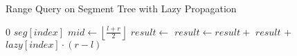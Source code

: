 \begin{algorithm}[H]
    \caption{Range Query on Segment Tree with Lazy Propagation}
    \begin{algorithmic}
                \State \Return $0$
            \EndIf
                \State \Return $seg[index]$
            \EndIf
            \State $mid \gets \left\lfloor \frac{l + r}{2} \right\rfloor$
            \State $result \gets$ 
            \State $result \gets result +$ 
            \State \Return $result$ + $lazy[index] \cdot (r-l)$
        \EndProcedure
    \end{algorithmic}
\end{algorithm}